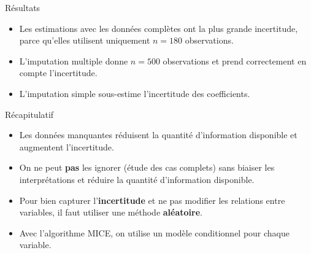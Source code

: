 \documentclass[
  ignorenonframetext,
]{beamer}
\providecommand{\tightlist}{%
  \setlength{\itemsep}{0pt}\setlength{\parskip}{0pt}}\usepackage{longtable,booktabs,array}
\begin{document}
\begin{frame}{Résultats}
\label{ruxe9sultats}
\begin{itemize}
\tightlist
\item
  Les estimations avec les données complètes ont la plus grande
  incertitude, parce qu'elles utilisent uniquement \(n=180\)
  observations.
\item
  L'imputation multiple donne \(n=500\) observations et prend
  correctement en compte l'incertitude.
\item
  L'imputation simple sous-estime l'incertitude des coefficients.
\end{itemize}

\small

\begin{table}

\caption{\label{tbl-manquantsres}Estimation des coefficients et erreurs
type pour quelques paramètres du modèle.}


\end{table}%

\normalsize
\end{frame}

\begin{frame}{Récapitulatif}
\label{ruxe9capitulatif-4}
\begin{itemize}
\tightlist
\item
  Les données manquantes réduisent la quantité d'information disponible
  et augmentent l'incertitude.
\item
  On ne peut \textbf{pas} les ignorer (étude des cas complets) sans
  biaiser les interprétations et réduire la quantité d'information
  disponible.
\item
  Pour bien capturer l'\textbf{incertitude} et ne pas modifier les
  relations entre variables, il faut utiliser une méthode
  \textbf{aléatoire}.
\item
  Avec l'algorithme MICE, on utilise un modèle conditionnel pour chaque
  variable.
\end{itemize}
\end{frame}
\end{document}
